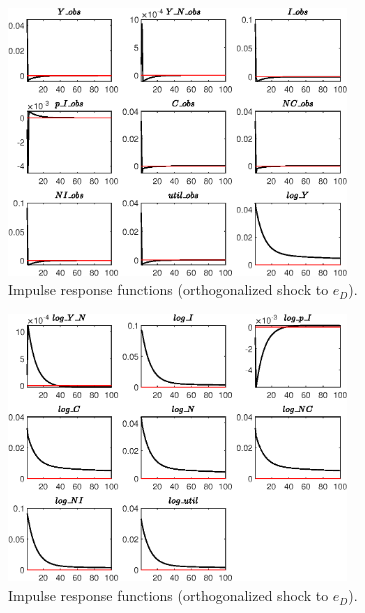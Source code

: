 \begin{figure}[H]
\centering 
\includegraphics[width=0.80\textwidth]{BRS_imp_mobility_alt/graphs/BRS_imp_mobility_alt_IRF_e_D1}
\caption{Impulse response functions (orthogonalized shock to ${e_D}$).}\label{Fig:IRF:e_D:1}
\end{figure}
 
\begin{figure}[H]
\centering 
\includegraphics[width=0.80\textwidth]{BRS_imp_mobility_alt/graphs/BRS_imp_mobility_alt_IRF_e_D2}
\caption{Impulse response functions (orthogonalized shock to ${e_D}$).}\label{Fig:IRF:e_D:2}
\end{figure}
 

